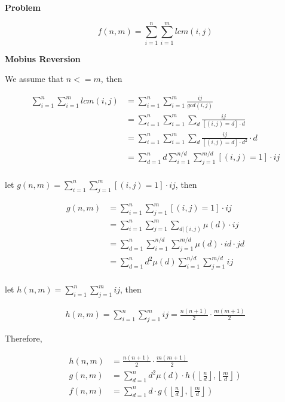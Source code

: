 \noindent\textbf{Problem}

\begin{equation*}
f(n, m) = \sum_{i=1}^{n} \sum_{i=1}^{m} lcm(i, j)
\end{equation*}

\noindent\textbf{Mobius Reversion}

We assume that $n <= m$, then 

\begin{equation*}
\begin{aligned}
\sum_{i=1}^{n} \sum_{i=1}^{m} lcm(i, j) &= \sum_{i=1}^{n} \sum_{i=1}^{m} \frac{ij}{gcd(i, j)} \\
&= \sum_{i=1}^{n} \sum_{i=1}^{m} \sum_{d} \frac{ij}{\left[(i, j) = d\right] \cdot d} \\
&= \sum_{i=1}^{n} \sum_{i=1}^{m} \sum_{d} \frac{ij}{\left[(i, j) = d\right] \cdot d^2} \cdot d \\
&= \sum_{d=1}^{n} d \sum_{i=1}^{n/d} \sum_{j=1}^{m/d} \left[(i, j) = 1\right] \cdot ij \\
\end{aligned}
\end{equation*}

let $g(n, m) = \sum_{i=1}^{n} \sum_{j=1}^{m} \left[(i, j) = 1\right] \cdot ij$, then

\begin{equation*}
\begin{aligned}
g(n, m) &= \sum_{i=1}^{n} \sum_{j=1}^{m} \left[(i, j) = 1\right] \cdot ij \\
&= \sum_{i=1}^{n} \sum_{j=1}^{m} \sum_{d | (i,j)} \mu(d) \cdot ij \\
&= \sum_{d=1}^{n} \sum_{i=1}^{n/d} \sum_{j=1}^{m/d} \mu(d) \cdot id \cdot jd \\
&= \sum_{d=1}^{n} d^2 \mu(d) \sum_{i=1}^{n/d} \sum_{j=1}^{m/d} ij \\
\end{aligned}
\end{equation*}

let $h(n, m) = \sum_{i=1}^{n} \sum_{j=1}^{m} ij$, then

\begin{equation*}
\begin{aligned}
h(n, m) = \sum_{i=1}^{n} \sum_{j=1}^{m} ij = \frac{n(n+1)}{2} \cdot \frac{m(m+1)}{2}
\end{aligned}
\end{equation*}

Therefore,

\begin{equation*}
\begin{aligned}
h(n, m) &= \frac{n(n+1)}{2} \cdot \frac{m(m+1)}{2} \\
g(n, m) &= \sum_{d=1}^{n} d^2 \mu(d) \cdot h\left(\left\lfloor\frac{n}{d} \right\rfloor, \left\lfloor\frac{m}{d}\right\rfloor \right) \\
f(n, m) &= \sum_{d=1}^{n} d \cdot g\left(\left\lfloor\frac{n}{d} \right\rfloor, \left\lfloor\frac{m}{d}\right\rfloor \right)
\end{aligned}
\end{equation*}

